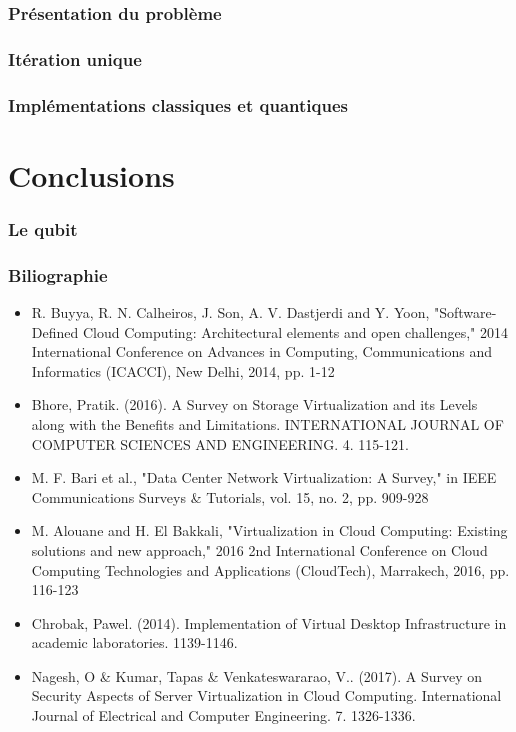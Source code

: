 \documentclass{beamer}
\begin{document}
\begin{frame}
\frametitle{Présentation du problème}
\end{frame}

\begin{frame}
\frametitle{Itération unique}
\end{frame}

\begin{frame}
\frametitle{Implémentations classiques et quantiques}
\end{frame}


\section{Conclusions}

\begin{frame}
\frametitle{Le qubit}
\end{frame}

\begin{frame}
\frametitle{Biliographie}
\begin{itemize}
    \fontsize{6pt}{7.2}\selectfont

    \item R. Buyya, R. N. Calheiros, J. Son, A. V. Dastjerdi and Y. Yoon, "Software-Defined Cloud Computing: Architectural elements and open challenges," 2014 International Conference on Advances in Computing, Communications and Informatics (ICACCI), New Delhi, 2014, pp. 1-12
    \item Bhore, Pratik. (2016). A Survey on Storage Virtualization and its Levels along with the Benefits and Limitations. INTERNATIONAL JOURNAL OF COMPUTER SCIENCES AND ENGINEERING. 4. 115-121.
    \item M. F. Bari et al., "Data Center Network Virtualization: A Survey," in IEEE Communications Surveys \& Tutorials, vol. 15, no. 2, pp. 909-928
    \item M. Alouane and H. El Bakkali, "Virtualization in Cloud Computing: Existing solutions and new approach," 2016 2nd International Conference on Cloud Computing Technologies and Applications (CloudTech), Marrakech, 2016, pp. 116-123
    \item Chrobak, Pawel. (2014). Implementation of Virtual Desktop Infrastructure in academic laboratories. 1139-1146.
    \item Nagesh, O \& Kumar, Tapas \& Venkateswararao, V.. (2017). A Survey on Security Aspects of Server Virtualization in Cloud Computing. International Journal of Electrical and Computer Engineering. 7. 1326-1336.
\end{itemize}

\end{frame}
\end{document}
